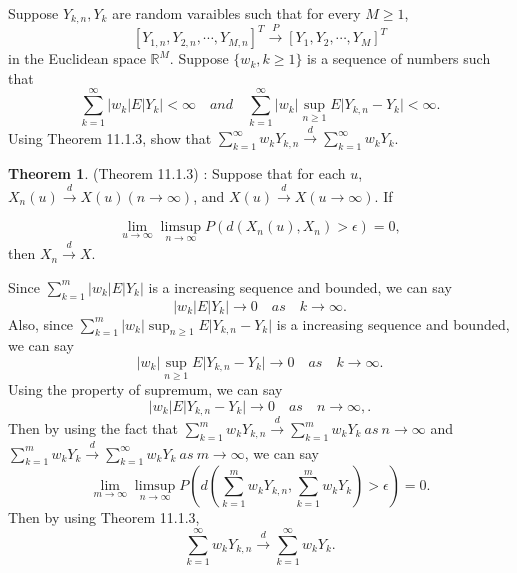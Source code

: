 \documentclass{article}
\theoremstyle{definition}
\newtheorem{theorem}{Theorem}[section]
\numberwithin{equation}{section}
\begin{document}
\begin{problem}
Suppose $Y_{k,n}, Y_{k}$ are random varaibles such that for every $M \geq 1$,
$$
{[Y_{1,n}, Y_{2,n}, \cdots , Y_{M,n}]}^{T} \overset{P}{\to}
{[Y_{1}, Y_{2}, \cdots , Y_{M}]}^{T}
$$
in the Euclidean space $\mathbb{R}^{M}$.
Suppose $\{w_{k}, k \geq 1 \}$ is a sequence of numbers such that
$$\sum_{k=1}^{\infty} \lvert w_{k} \rvert E \lvert Y_{k} \rvert < \infty \quad and \quad 
\sum_{k=1}^{\infty} \lvert w_{k} \rvert \sup_{n \geq 1} E \lvert Y_{k,n} - Y_{k} \rvert < \infty .
$$
Using Theorem 11.1.3, show that $\sum_{k=1}^{\infty} w_{k}Y_{k,n} \overset{d}{\to} \sum_{k=1}^{\infty} w_{k}Y_{k}$.

\begin{theorem}
(Theorem 11.1.3) : 
Suppose that for each $u$, $X_{n}(u) \overset{d}{\to} X(u) (n \to \infty) $, and
$X(u) \overset{d}{\to} X (u \to \infty) $. If

$$
\lim_{u \to \infty} \limsup_{n \to \infty} P(d(X_{n}(u), X_{n}) > \epsilon) = 0,
$$
then $X_{n} \overset{d}{\to} X.$
\end{theorem}







\end{problem}

\begin{mysol}
Since $\sum_{k=1}^{m} \lvert w_{k} \rvert E \lvert Y_{k} \rvert $ is a increasing sequence and bounded,
we can say
$$
\lvert w_{k} \rvert E \lvert Y_{k} \rvert \rightarrow 0 \quad as \quad k \rightarrow \infty.
$$
Also, since $\sum_{k=1}^{m} \lvert w_{k} \rvert \sup_{n \geq 1} E \lvert Y_{k,n} - Y_{k} \rvert$ is a increasing sequence and bounded, we can say
$$
\lvert w_{k} \rvert \sup_{n \geq 1} E \lvert Y_{k,n} - Y_{k} \rvert \rightarrow 0 \quad as \quad k \rightarrow \infty.
$$
Using the property of supremum, we can say 
$$
\lvert w_{k} \rvert E \lvert Y_{k,n} - Y_{k} \rvert \rightarrow 0 \quad as \quad n \rightarrow \infty,.
$$
Then by using the fact that $ \sum_{k=1}^{m}w_{k} Y_{k,n} \overset{d}{\to} \sum_{k=1}^{m}w_{k} Y_{k} \ as \ n \to \infty$ and $ \sum_{k=1}^{m}w_{k} Y_{k} \overset{d}{\to} \sum_{k=1}^{\infty}w_{k} Y_{k} \ as \ m \to \infty$, we can say
$$
\lim_{m \to \infty} \limsup_{n \to \infty} P(d( \sum_{k=1}^{m}w_{k}Y_{k,n}, \sum_{k=1}^{m}w_{k}Y_{k}) > \epsilon) = 0.
$$
Then by using Theorem 11.1.3,
$$\sum_{k=1}^{\infty} w_{k}Y_{k,n} \overset{d}{\to} \sum_{k=1}^{\infty} w_{k}Y_{k}.$$



\end{mysol}
\end{document}
